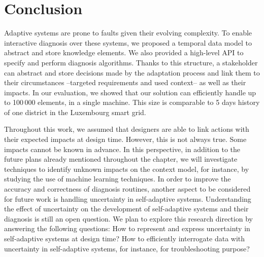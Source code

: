 \section{Conclusion}
\label{sec:tkm:conclusion}

Adaptive systems are prone to faults  given their evolving complexity.
To enable interactive diagnosis over these systems, we proposed a temporal data model to abstract and store knowledge elements. We also provided a high-level API to specify and perform diagnosis algorithms.
Thanks to this structure, a stakeholder can abstract and store decisions made by the adaptation process and link them to their circumstances --targeted requirements and used context-- as well as their impacts.
In our evaluation, we showed that our solution can efficiently handle up to 100\,000 elements, in a single machine.
This size is comparable to 5 days history of one district in the Luxembourg smart grid.


Throughout this work, we assumed that designers are able to link actions with their expected impacts at design time. However, this is not always true. Some impacts  cannot be known in advance.
In this perspective, in addition to the future plans already mentioned throughout the chapter, we will investigate techniques to identify unknown impacts on the context model, for instance, by studying the use of machine learning  techniques.
In order to improve the accuracy and correctness of diagnosis routines, another aspect to be considered for future work is handling uncertainty in self-adaptive systems.
Understanding the effect of uncertainty on the development of self-adaptive systems and their diagnosis is still an open question.
We plan to explore this research direction by answering the following questions: How to represent and express uncertainty in self-adaptive systems at design time?
How to efficiently interrogate data with uncertainty in self-adaptive systems,  for instance, for troubleshooting purpose?